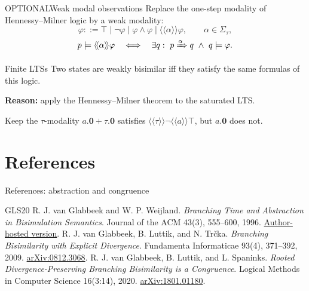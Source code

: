 \documentclass[handout,aspectratio=169,11pt]{beamer}
\newcommand{\wstep}[1]{\xRightarrow{#1}}
\newcommand{\nil}{\mathbf 0}
\newcommand{\Act}{\Sigma_\tau}
\newcommand{\optional}{\textcolor{Muted}{\scriptsize OPTIONAL}\quad}
\begin{document}
\begin{frame}{\optional Weak modal observations}
  Replace the one-step modality of Hennessy--Milner logic by a weak modality:
  \[
    \varphi::=\top\mid\neg\varphi\mid\varphi\land\varphi
       \mid\langle\!\langle\alpha\rangle\!\rangle\varphi,
       \qquad \alpha\in\Act,
  \]
  \[
    p\models\langle\!\langle\alpha\rangle\!\rangle\varphi
    \quad\Longleftrightarrow\quad
    \exists q:\ p\wstep{\alpha}q\ \land\ q\models\varphi.
  \]
  \begin{block}{Finite LTSs}
    Two states are weakly bisimilar iff they satisfy the same formulas of this logic.
  \end{block}
  \textbf{Reason:} apply the Hennessy--Milner theorem to the saturated LTS.
  \begin{alertblock}{Keep the $\tau$-modality}
    $a.\nil+\tau.\nil$ satisfies
    $\langle\!\langle\tau\rangle\!\rangle\neg\langle\!\langle a\rangle\!\rangle\top$,
    but $a.\nil$ does not.
  \end{alertblock}
\end{frame}




\section{References}
\begin{frame}{References: abstraction and congruence}
  \small
  \begin{thebibliography}{GLS20}
      R. J. van Glabbeek and W. P. Weijland.
      \emph{Branching Time and Abstraction in Bisimulation Semantics}.
      Journal of the ACM 43(3), 555--600, 1996.
      \newblock\href{https://theory.stanford.edu/~rvg/abstraction/}{Author-hosted version}.
      R. J. van Glabbeek, B. Luttik, and N. Tr\v{c}ka.
      \emph{Branching Bisimilarity with Explicit Divergence}.
      Fundamenta Informaticae 93(4), 371--392, 2009.
      \newblock\href{https://arxiv.org/abs/0812.3068}{arXiv:0812.3068}.
      R. J. van Glabbeek, B. Luttik, and L. Spaninks.
      \emph{Rooted Divergence-Preserving Branching Bisimilarity is a Congruence}.
      Logical Methods in Computer Science 16(3:14), 2020.
      \newblock\href{https://arxiv.org/abs/1801.01180}{arXiv:1801.01180}.
  \end{thebibliography}
\end{frame}
\end{document}
